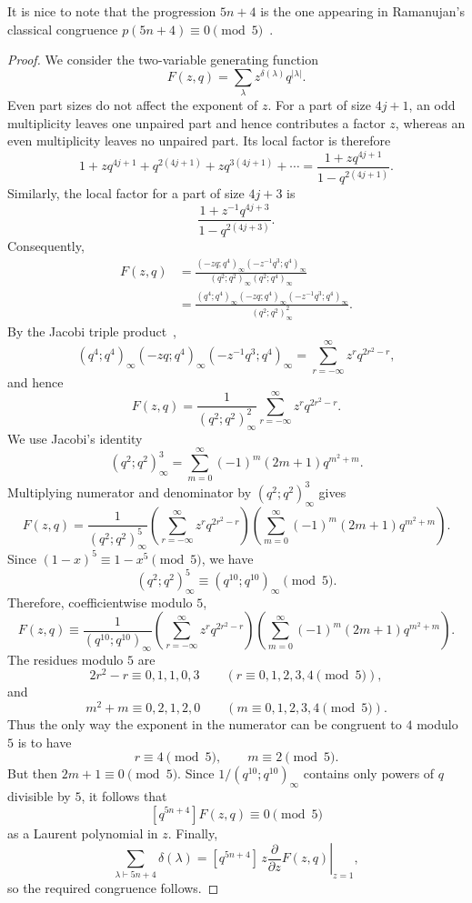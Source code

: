 \documentclass[11pt]{article}
\theoremstyle{definition}
\theoremstyle{remark}
\begin{document}
It is nice to note that the progression $5n+4$ is the one appearing in Ramanujan's classical congruence $p(5n+4)\equiv0\pmod5$~\cite{Ramanujan1921}. 
\begin{proof}
We consider the two-variable generating function
\[
 F(z,q)=\sum_{\lambda}z^{\delta(\lambda)}q^{|\lambda|}.
\]
Even part sizes do not affect the exponent of $z$.  For a part
of size $4j+1$, an odd multiplicity leaves one unpaired part and hence contributes a
factor $z$, whereas an even multiplicity leaves no unpaired part.  Its local
factor is therefore
\[
 1+zq^{4j+1}+q^{2(4j+1)}+zq^{3(4j+1)}+\cdots
 =\frac{1+zq^{4j+1}}{1-q^{2(4j+1)}}.
\]
Similarly, the local factor for a part of size $4j+3$ is
\[
 \frac{1+z^{-1}q^{4j+3}}{1-q^{2(4j+3)}}.
\]
Consequently,
\begin{align*}
 F(z,q)
 &=\frac{(-zq;q^4)_\infty(-z^{-1}q^3;q^4)_\infty}
 {(q^2;q^2)_\infty(q^2;q^4)_\infty}\\
 &=\frac{(q^4;q^4)_\infty(-zq;q^4)_\infty
 (-z^{-1}q^3;q^4)_\infty}{(q^2;q^2)_\infty^2}.
\end{align*}
By the Jacobi triple product~\cite[Chapter~2]{AndrewsPartitions},
\[
 (q^4;q^4)_\infty(-zq;q^4)_\infty(-z^{-1}q^3;q^4)_\infty
 =\sum_{r=-\infty}^{\infty}z^r q^{2r^2-r},
\]
and hence
\[
 F(z,q)=\frac{1}{(q^2;q^2)_\infty^2}
 \sum_{r=-\infty}^{\infty}z^r q^{2r^2-r}.
\]
We use Jacobi's identity~\cite[Chapter~2]{AndrewsPartitions}
\[
 (q^2;q^2)_\infty^3
 =\sum_{m=0}^{\infty}(-1)^m(2m+1)q^{m^2+m}.
\]
Multiplying numerator and denominator by $(q^2;q^2)_\infty^3$ gives
\[
 F(z,q)=\frac{1}{(q^2;q^2)_\infty^5}
 \left(\sum_{r=-\infty}^{\infty}z^r q^{2r^2-r}\right)
 \left(\sum_{m=0}^{\infty}(-1)^m(2m+1)q^{m^2+m}\right).
\]
Since $(1-x)^5\equiv1-x^5\pmod5$, we have
\[
 (q^2;q^2)_\infty^5\equiv(q^{10};q^{10})_\infty\pmod5.
\]
Therefore, coefficientwise modulo $5$,
\[
 F(z,q)\equiv\frac{1}{(q^{10};q^{10})_\infty}
 \left(\sum_{r=-\infty}^{\infty}z^r q^{2r^2-r}\right)
 \left(\sum_{m=0}^{\infty}(-1)^m(2m+1)q^{m^2+m}\right).
\]
The residues modulo $5$ are
\[
 2r^2-r\equiv0,1,1,0,3
 \qquad (r\equiv0,1,2,3,4\pmod5),
\]
and
\[
 m^2+m\equiv0,2,1,2,0
 \qquad (m\equiv0,1,2,3,4\pmod5).
\]
Thus the only way the exponent in the numerator can be congruent to $4$
modulo $5$ is to have
\[
 r\equiv4\pmod5,
 \qquad
 m\equiv2\pmod5.
\]
But then $2m+1\equiv0\pmod5$.  Since
$1/(q^{10};q^{10})_\infty$ contains only powers of $q$ divisible by $5$, it
follows that
\[
 [q^{5n+4}]F(z,q)\equiv0\pmod5
\]
as a Laurent polynomial in $z$.  Finally,
\[
 \sum_{\lambda\vdash 5n+4}\delta(\lambda)
 =\left.[q^{5n+4}]\,z\frac{\partial}{\partial z}F(z,q)\right|_{z=1},
\]
so the required congruence follows.
\end{proof}
\end{document}

